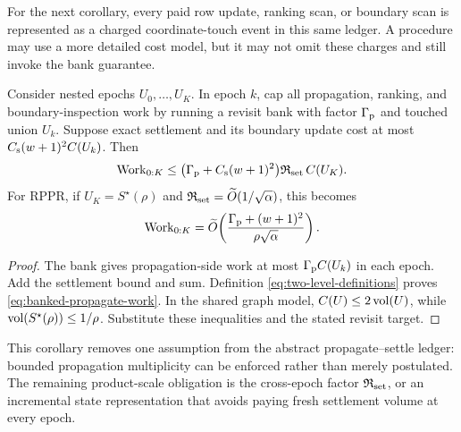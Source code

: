 For the next corollary, every paid row update, ranking scan, or boundary scan
is represented as a charged coordinate-touch event in this same ledger.  A
procedure may use a more detailed cost model, but it may not omit these
charges and still invoke the bank guarantee.

\begin{corollary}
\label{cor:banked-propagate-settle}
Consider nested epochs $U_0,\ldots,U_K$.  In epoch $k$, cap all propagation,
ranking, and boundary-inspection work by running a revisit bank with factor
$\Gamma_{\rm p}$ and touched union $U_k$.  Suppose exact settlement and its
boundary update cost at most
$C_{\rm s}(w+1)^2C(U_k)$.  Then
\begin{equation}
 \operatorname{Work}_{0:K}
 \leq
 \bigl(\Gamma_{\rm p}+C_{\rm s}(w+1)^2\bigr)
 \mathfrak R_{\rm set}\,C(U_K).
 \label{eq:banked-propagate-work}
\end{equation}
For RPPR, if $U_K=S^\star(\rho)$ and
$\mathfrak R_{\rm set}=\widetilde O(1/\sqrt\alpha)$, this becomes
\begin{equation}
 \operatorname{Work}_{0:K}
 =\widetilde O\!\left(
 \frac{\Gamma_{\rm p}+(w+1)^2}{\rho\sqrt\alpha}
 \right).
 \label{eq:banked-rppr-product}
\end{equation}
\end{corollary}

\begin{proof}
The bank gives propagation-side work at most
$\Gamma_{\rm p}C(U_k)$ in each epoch.  Add the settlement bound and sum.
Definition \eqref{eq:two-level-definitions} proves
\eqref{eq:banked-propagate-work}.  In the shared graph model,
$C(U)\leq2\operatorname{vol}(U)$, while
$\operatorname{vol}(S^\star(\rho))\leq1/\rho$.  Substitute these inequalities and the
stated revisit target.
\end{proof}

This corollary removes one assumption from the abstract propagate--settle
ledger: bounded propagation multiplicity can be enforced rather than merely
postulated.  The remaining product-scale obligation is the cross-epoch
factor $\mathfrak R_{\rm set}$, or an incremental state representation that
avoids paying fresh settlement volume at every epoch.

